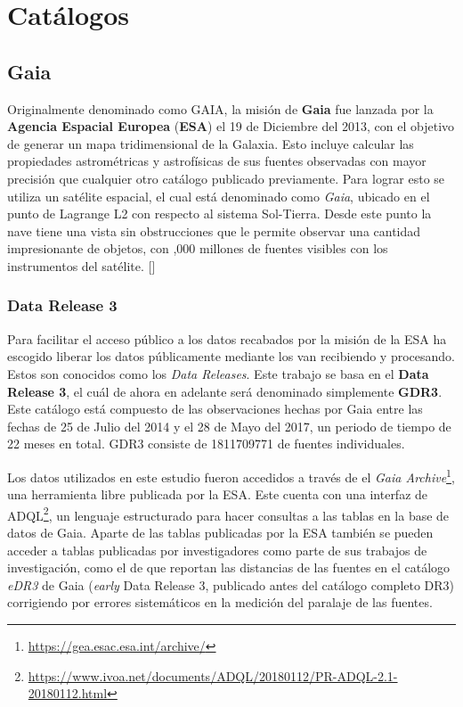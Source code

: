 \chapter{Catálogos}

\section{Gaia} \label{muestra:sec:gaia}

Originalmente denominado como GAIA, la misión de \textbf{Gaia} fue lanzada por
la \textbf{Agencia Espacial Europea} (\textbf{ESA}) el 19 de Diciembre del 2013, con el
objetivo de generar un mapa tridimensional de la Galaxia.
Esto incluye calcular las propiedades astrométricas y astrofísicas de sus
fuentes observadas con mayor precisión que cualquier otro catálogo publicado
previamente. Para lograr esto se utiliza un satélite espacial, el cual está
denominado como \textit{Gaia}, ubicado en el punto de Lagrange L2 con respecto al
sistema Sol-Tierra. Desde este punto la nave tiene una vista sin obstrucciones
que le permite observar una cantidad impresionante de objetos, con ,000 millones de fuentes visibles con los instrumentos del satélite. [] 

\subsection{Data Release 3}

Para facilitar el acceso público a los datos recabados por la misión de \gaia la
ESA ha escogido liberar los datos públicamente mediante los van recibiendo y
procesando. Estos son conocidos como los \textit{Data Releases}. Este trabajo se
basa en el \textbf{Data Release 3}, el cuál de ahora en adelante será denominado
simplemente \textbf{GDR3}. Este catálogo está compuesto de las observaciones
hechas por Gaia entre las fechas de 25 de Julio del 2014 y el 28 de Mayo del
2017, un periodo de tiempo de 22 meses en total. GDR3 consiste
de \num{1811709771} de fuentes individuales. 

Los datos utilizados en este estudio fueron accedidos a través de el
\textit{Gaia Archive}\footnote{\url{https://gea.esac.esa.int/archive/}}, una
herramienta libre publicada por la ESA. Este cuenta con una interfaz de
ADQL\footnote{\url{https://www.ivoa.net/documents/ADQL/20180112/PR-ADQL-2.1-20180112.html}},
un lenguaje estructurado para hacer consultas a las tablas en la base de datos
de Gaia. Aparte de las tablas publicadas por la ESA también se pueden acceder a
tablas publicadas por investigadores como parte de sus trabajos de
investigación, como el de
 que reportan
las distancias de las fuentes en el catálogo \textit{eDR3} de Gaia
(\textit{early} Data Release 3, publicado antes del catálogo completo DR3)
corrigiendo por errores sistemáticos en la medición del paralaje de las fuentes.

